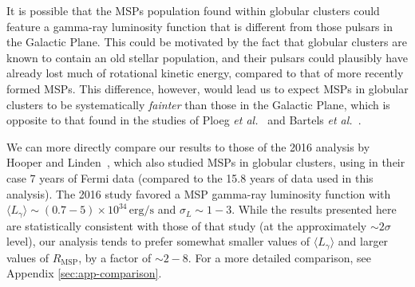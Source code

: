 It is possible that the MSPs population found within globular clusters could feature a gamma-ray luminosity function that is different from those pulsars in the Galactic Plane. This could be motivated by the fact that globular clusters are known to contain an old stellar population, and their pulsars could plausibly have already lost much of rotational kinetic energy, compared to that of more recently formed MSPs. This difference, however, would lead us to expect MSPs in globular clusters to be systematically \textit{fainter} than those in the Galactic Plane, which is opposite to that found in the studies of Ploeg \textit{et al.}~\cite{Ploeg:2017vai} and Bartels \textit{et al.}~\cite{Bartels:2018xom}.   

We can more directly compare our results to those of the 2016 analysis by Hooper and Linden~\cite{Hooper:2016rap}, which also studied MSPs in globular clusters, using in their case 7 years of Fermi data (compared to the 15.8 years of data used in this analysis). The 2016 study favored a MSP gamma-ray luminosity function with $\langle L_{\gamma} \rangle \sim (0.7-5) \times 10^{34} \, \textrm{erg/s}$ and $\sigma_L \sim 1-3$. While the results presented here are statistically consistent with those of that study (at the approximately $\sim 2\sigma$ level), our analysis tends to prefer somewhat smaller values of $\langle L_{\gamma} \rangle$ and larger values of $R_\textrm{MSP}$, by a factor of $\sim 2-8$. For a more detailed comparison, see Appendix \ref{sec:app-comparison}.

